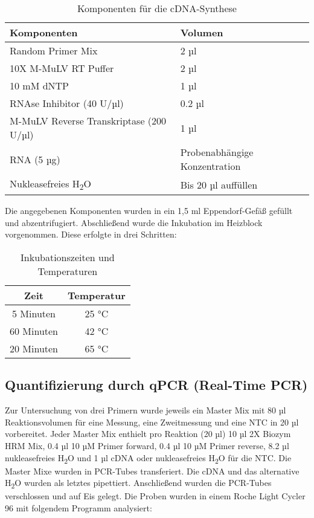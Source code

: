 \documentclass{article}
\begin{document}
\begin{table}[H]
\centering
\begin{tabular}{|l|l|}
\hline
\textbf{Komponenten} & \textbf{Volumen} \\ \hline
Random Primer Mix & 2 µl \\ \hline
10X M-MuLV RT Puffer & 2 µl \\ \hline
10 mM dNTP & 1 µl \\ \hline
RNAse Inhibitor (40 U/µl) & 0.2 µl \\ \hline
M-MuLV Reverse Transkriptase (200 U/µl) & 1 µl \\ \hline
RNA (5 µg) & Probenabhängige Konzentration \\ \hline
Nukleasefreies H\textsubscript{2}O & Bis 20 µl auffüllen \\ \hline
\end{tabular}
\caption{Komponenten für die cDNA-Synthese}
\end{table}

Die angegebenen Komponenten wurden in ein 1,5 ml
Eppendorf-Gefäß gefüllt und abzentrifugiert.
Abschließend wurde die Inkubation im Heizblock vorgenommen.
Diese erfolgte in drei Schritten:

\begin{table}[H]
    \centering
    \begin{tabular}{|c|c|}
    \hline
    \textbf{Zeit} & \textbf{Temperatur} \\ \hline
    5 Minuten & 25 °C \\ \hline
    60 Minuten & 42 °C \\ \hline
    20 Minuten & 65 °C \\ \hline
    \end{tabular}
    \caption{Inkubationszeiten und Temperaturen}
    \end{table}

\subsection{Quantifizierung durch qPCR (Real-Time PCR)}

Zur Untersuchung von drei Primern wurde jeweils ein
Master Mix mit 80 µl Reaktionsvolumen für eine Messung,
eine Zweitmessung und eine NTC in 20 µl vorbereitet.
Jeder Master Mix enthielt pro Reaktion (20 µl) 10 µl 2X Biozym HRM Mix,
0.4 µl 10 µM Primer forward, 0.4 µl 10 µM Primer reverse, 8.2 µl
nukleasefreies H\textsubscript{2}O und 1 µl cDNA oder
nukleasefreies H\textsubscript{2}O für die NTC. Die Master Mixe
wurden in PCR-Tubes transferiert. Die cDNA und das
alternative H\textsubscript{2}O wurden als letztes pipettiert.
Anschließend wurden die PCR-Tubes verschlossen und auf Eis gelegt.
Die Proben wurden in einem Roche Light Cycler 96 mit folgendem
Programm analysiert:
\end{document}
